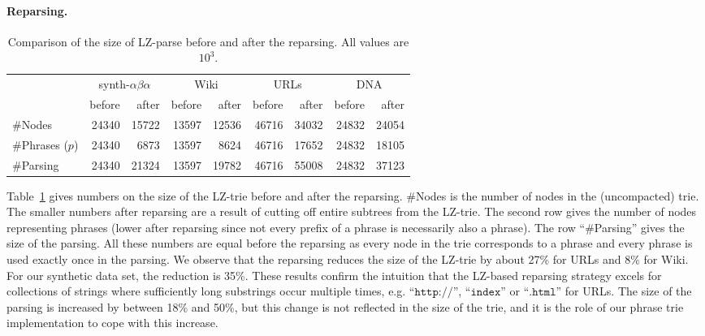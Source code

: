 \documentclass{llncs}
\newcommand{\str}[1]{\ensuremath{\texttt{#1}}}
\begin{document}
\paragraph{Reparsing.}
\begin{table}[t]
\caption{Comparison of the size of LZ-parse before and after the reparsing. All values are $10^3$.}
\label{tab:datasets}
\centering
\begin{tabular}{lrrrrrrrr}
\toprule
& \multicolumn{2}{c}{synth-$\alpha\beta\alpha$} & \multicolumn{2}{c}{Wiki} & \multicolumn{2}{c}{URLs}  & \multicolumn{2}{c}{DNA}\\
\cmidrule(lr){2-3} \cmidrule(lr){4-5} \cmidrule(lr){6-7} \cmidrule(lr){8-9}
		 & before & after & before & after 	& before & after & before & after  \\
\midrule
\#Nodes 		& 24340 & 15722 & 13597 & 12536	& 46716	& 34032 & 24832	& 24054 \\
\#Phrases ($p$) & 24340 & 6873 & 13597  & 8624	& 46716	& 17652	& 24832	& 18105 \\
\#Parsing		 & 24340 & 21324 & 13597& 19782 & 46716	& 55008	& 24832	& 37123 \\
\bottomrule
\end{tabular}
\end{table}
Table~\ref{tab:datasets} gives numbers on the size of the LZ-trie before and after the reparsing. \#Nodes is the number of nodes in the (uncompacted) trie. The smaller numbers after reparsing are a result of cutting off entire subtrees from the LZ-trie. The second row gives the number of nodes representing phrases (lower after reparsing since not every prefix of a phrase is necessarily also a phrase). The row ``\#Parsing'' gives the size of the parsing.
All these numbers are equal before the reparsing as every node in the trie corresponds to a phrase and every phrase is used exactly once in the parsing.
We observe that the reparsing reduces the size of the LZ-trie by about 27\% for URLs and 8\% for Wiki. For our synthetic data set, the reduction is 35\%. These results confirm the intuition that the LZ-based reparsing strategy excels for collections of strings where sufficiently long substrings occur multiple times, e.g.    ``$\str{http://}$'', ``$\str{index}$'' or ``$\str{.html}$'' for URLs. The size of the parsing is increased by between 18\% and 50\%, but this change is not reflected in the size of the trie, and it is the role of our phrase trie implementation to cope with this increase.
\end{document}
